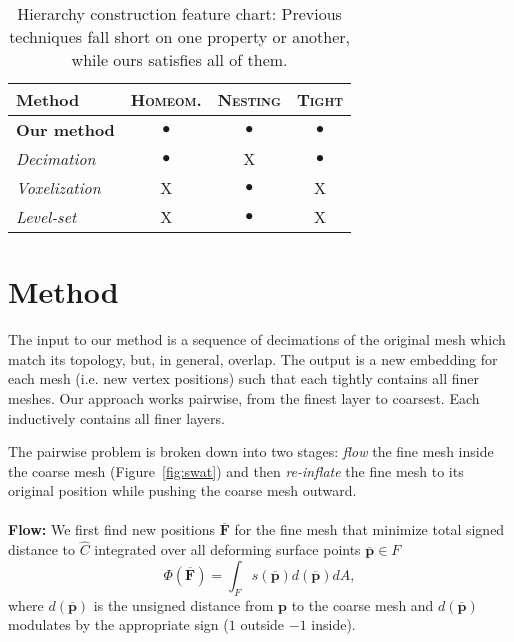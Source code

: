 \documentclass{cgyrf15}
\newcommand{\ra}[1]{\renewcommand{\arraystretch}{#1}}
\newcommand{\NO}{{\color{red}\textsf{X}}}
\newcommand{\YES}{$\bullet$}
\begin{document}
\begin{table}
\centering
\ra{1.2}
\setlength{\tabcolsep}{5.5pt}
\begin{tabularx}{\linewidth}{X c c c}
\rowcolor{white}
\toprule
Method               & \textsc{Homeom.} & \textsc{Nesting}& \textsc{Tight} \\
\midrule                                                                       
\textbf{Our method}  & \YES                  & \YES            & \YES           \\
\emph{Decimation}                                                               
                     & \YES                  & \NO             & \YES           \\
\emph{Voxelization}                                                             
                     & \NO                   & \YES            & \NO            \\
\emph{Level-set}                                                                
                     & \NO                   & \YES            & \NO            \\
\bottomrule
\end{tabularx}
\caption{Hierarchy construction feature chart: Previous techniques fall short
on one property or another, while ours satisfies all of them.}
\label{tab:feature-chart}
\end{table}

\section{Method}

The input to our method is a sequence of decimations of the original mesh which
match its topology, but, in general, overlap. The output is a new embedding for
each mesh (i.e. new vertex positions) such that each tightly contains all finer
meshes. Our approach works pairwise, from the finest layer to coarsest. Each
inductively contains all finer layers.

The pairwise problem is broken down into two stages: \emph{flow} the fine mesh
inside the coarse mesh  (Figure~\ref{fig:swat}) and then \emph{re-inflate} the
fine mesh to its original position while pushing the coarse mesh outward.\\ \\
\textbf{Flow:} We first find new positions $\overline{\mathbf{F}}$ for the fine
mesh that minimize total signed distance to $\hat{C}$ integrated over all
deforming surface points $\overline{\textbf{p}} \in F$ \begin{equation}
\Phi(\overline{\mathbf{F}}) = \int_F s(\overline{\mathbf{p}})
d(\overline{\mathbf{p}}) dA, \label{eq:flow_energy} \end{equation} where
$d(\overline{\mathbf{p}})$ is the unsigned distance from $\mathbf{p}$ to the
coarse mesh and $d(\overline{\mathbf{p}})$ modulates by the appropriate sign
($1$ outside $-1$ inside).
\end{document}
